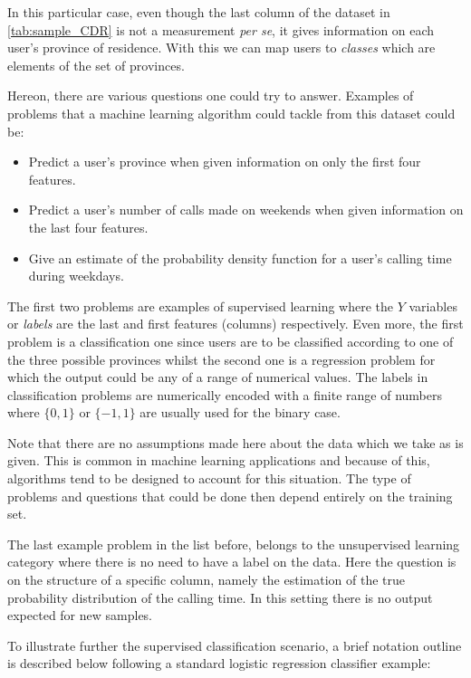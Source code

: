 In this particular case, even though the last column of the dataset in \ref{tab:sample_CDR} is not a measurement \textit{per se}, it gives information on each user's province of residence. With this we can map users to \textit{classes} which are elements of the set of provinces.

Hereon, there are various questions one could try to answer. Examples of problems that a machine learning algorithm could tackle from this dataset could be:

\begin{itemize}
\item Predict a user's province when given information on only the first four features.
\item Predict a user's number of calls made on weekends when given information on the last four features.
\item Give an estimate of the probability density function for a user's calling time during weekdays.
\end{itemize}

The first two problems are examples of supervised learning where the $Y$ variables or \textit{labels} are the last and first features (columns) respectively. Even more, the first problem is a classification one since users are to be classified according to one of the three possible provinces whilst the second one is a regression problem for which the output could be any of a range of numerical values. The labels in classification problems are numerically encoded with a finite range of numbers where $\{0,1\}$ or $\{-1,1\}$ are usually used for the binary case.

Note that there are no assumptions made here about the data which we take as is given. %
This is common in machine learning applications and because of this, algorithms tend to be designed to account for this situation. The type of problems and questions that could be done then depend entirely on the training set.

The last example problem in the list before, belongs to the unsupervised learning category where there is no need to have a label on the data. Here the question is on the structure of a specific column, namely the estimation of the true probability distribution of the calling time. In this setting there is no output expected for new samples.

To illustrate further the supervised classification scenario, a brief notation outline is described below following a standard logistic regression classifier example:

